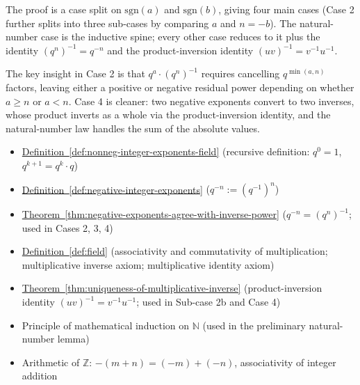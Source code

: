 \begin{remark*}
The proof is a case split on $\mathrm{sgn}(a)$ and $\mathrm{sgn}(b)$, giving
four main cases (Case 2 further splits into three sub-cases by comparing $a$
and $n = -b$).  The natural-number case is the inductive spine; every other
case reduces to it plus the identity $(q^n)^{-1} = q^{-n}$ and the
product-inversion identity $(uv)^{-1} = v^{-1}u^{-1}$.

The key insight in Case 2 is that $q^a\cdot(q^n)^{-1}$ requires cancelling
$q^{\min(a,n)}$ factors, leaving either a positive or negative residual power
depending on whether $a\geq n$ or $a < n$.  Case 4 is cleaner: two negative
exponents convert to two inverses, whose product inverts as a whole via the
product-inversion identity, and the natural-number law handles the sum of the
absolute values.
\end{remark*}

\begin{dependencies}
\begin{itemize}
  \item \hyperref[def:nonneg-integer-exponents-field]{Definition~\ref*{def:nonneg-integer-exponents-field}}
        \textnormal{(recursive definition: $q^0=1$, $q^{k+1}=q^k\cdot q$)}
  \item \hyperref[def:negative-integer-exponents]{Definition~\ref*{def:negative-integer-exponents}}
        \textnormal{($q^{-n} := (q^{-1})^n$)}
  \item \hyperref[thm:negative-exponents-agree-with-inverse-power]{Theorem~\ref*{thm:negative-exponents-agree-with-inverse-power}}
        \textnormal{($q^{-n} = (q^n)^{-1}$; used in Cases 2, 3, 4)}
  \item \hyperref[def:field]{Definition~\ref*{def:field}}
        \textnormal{(associativity and commutativity of multiplication;
        multiplicative inverse axiom; multiplicative identity axiom)}
  \item \hyperref[thm:uniqueness-of-multiplicative-inverse]{Theorem~\ref*{thm:uniqueness-of-multiplicative-inverse}}
        \textnormal{(product-inversion identity $(uv)^{-1} = v^{-1}u^{-1}$;
        used in Sub-case 2b and Case 4)}
  \item Principle of mathematical induction on $\mathbb{N}$
        \textnormal{(used in the preliminary natural-number lemma)}
  \item Arithmetic of $\mathbb{Z}$: $-(m+n) = (-m)+(-n)$, associativity of
        integer addition
\end{itemize}
\end{dependencies}
